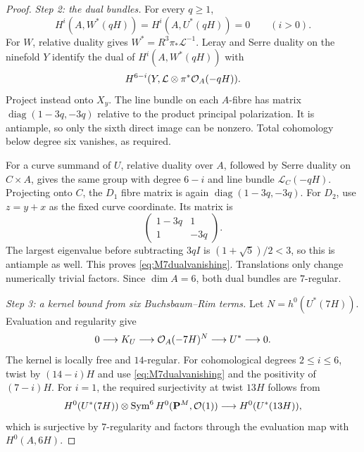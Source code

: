 \begin{proof}
\emph{Step 2: the dual bundles.}
For every $q\ge1$,
\begin{equation}\label{eq:M7dualvanishing}
 H^i(A,W^*(qH))=H^i(A,U^*(qH))=0\qquad(i>0).
\end{equation}
For $W$, relative duality gives $W^*=R^3\pi_*\mathcal L^{-1}$.
Leray and Serre duality on the ninefold $Y$ identify the dual of
$H^i(A,W^*(qH))$ with
\[
 H^{6-i}(Y,\mathcal L\otimes\pi^*\mathcal O_A(-qH)).
\]
Project instead onto $X_y$. The line bundle on each $A$-fibre has matrix
$\operatorname{diag}(1-3q,-3q)$ relative to the product principal
polarization. It is antiample, so only the sixth direct image can
be nonzero. Total cohomology below degree six vanishes, as required.

For a curve summand of $U$, relative duality over $A$, followed by Serre
duality on $C\times A$, gives the same group with degree $6-i$ and
line bundle $\mathcal L_C(-qH)$. Projecting onto $C$, the $D_1$ fibre
matrix is again $\operatorname{diag}(1-3q,-3q)$. For $D_2$, use
$z=y+x$ as the fixed curve coordinate. Its matrix is
\[
 \begin{pmatrix}1-3q&1\\1&-3q\end{pmatrix}.
\]
The largest eigenvalue before subtracting $3qI$ is
$(1+\sqrt5)/2<3$, so this is antiample as well. This proves
\eqref{eq:M7dualvanishing}. Translations only change numerically trivial
factors. Since $\dim A=6$, both dual bundles are $7$-regular.

\emph{Step 3: a kernel bound from six Buchsbaum--Rim terms.}
Let $N=h^0(U^*(7H))$. Evaluation and regularity give
\[
 0\longrightarrow K_U\longrightarrow\mathcal O_A(-7H)^N
                  \longrightarrow U^*\longrightarrow0.
\]
The kernel is locally free and $14$-regular. For cohomological degrees
$2\le i\le6$, twist by $(14-i)H$ and use
\eqref{eq:M7dualvanishing} and the positivity of $(7-i)H$.
For $i=1$, the required surjectivity at twist $13H$ follows from
\[
 H^0(U^*(7H))\otimes
       \operatorname{Sym}^6H^0(\mathbf P^M,\mathcal O(1))
       \longrightarrow H^0(U^*(13H)),
\]
which is surjective by $7$-regularity and factors through the evaluation
map with $H^0(A,6H)$.


\end{proof}
